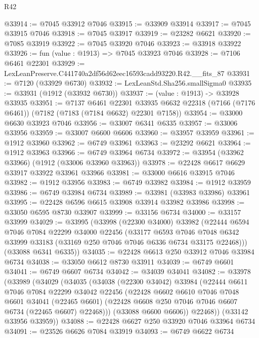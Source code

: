 \begin{lexlean}{R42}
\begin{coremodule}
{@33914 := @7045 @33912 @7046
@33915 := @33909 @33914
@33917 := @7045 @33915 @7046
@33918 := @7045 @33917
@33919 := @23282 @6621
@33920 := @7085 @33919
@33922 := @7045 @33920 @7046
@33923 := @33918 @33922
@33926 := fun (value : @1913) => @7045 @33923 @7046
@33928 := @7106 @6461 @22301
@33929 := LexLeanPreserve.C441740a2df56d62eec16593cadd93220.R42.__fits_87
@33931 := @7120 (@33929 @6730)
@33932 := LexLeanStd.Sha256.smallSigma0
@33935 := @33931 (@1912 (@33932 @6730))
@33937 := (value : @1913) -> @33928 @33935
@33951 := @7137
    @6461
    @22301
    @33935
    @6632
    @22318
    (@7166 (@7176 @6461))
    (@7182 (@7183 (@7184 @6632) @22301 @7158))
@33954 := @33000 @6630 @33923 @7046
@33956 := @33007 @6341 @6335
@33957 := @33006 @33956
@33959 := @33007 @6600 @6606
@33960 := @33957 @33959
@33961 := @1912 @33960
@33962 := @6749 @33961
@33963 := @23292 @6621
@33964 := @1912 @33963
@33966 := @6749 @33964 @6734
@33972 := @33954 (@33962 @33966) (@1912 (@33006 @33960 @33963))
@33978 := @22428 @6617 @6629 @33917 @33922 @33961 @33966
@33981 := @33000 @6616 @33915 @7046
@33982 := @1912 @33956
@33983 := @6749 @33982
@33984 := @1912 @33959
@33986 := @6749 @33984 @6734
@33989 := @33981 (@33983 @33986) @33961
@33995 := @22428 @6596 @6615 @33908 @33914 @33982 @33986
@33998 := @33050 @6595 @8730 @33907
@33999 := @33156 @6734
@34000 := @33157 @33999
@34029 := @33995
    (@33998
      (@22300 @34000)
      @33982
      (@22444
        @6594
        @7046
        @7084
        @22299
        @34000
        @22456
        (@33177
          @6593
          @7046
          @7048
          @6342
          @33999
          @33183
          (@33169 @250 @7046 @7046 @6336 @6734 @33175 @22468)))
      (@33088 @6341 @6335))
@34035 := @22428 @6613 @250 @33912 @7046 @33984 @6734
@34038 := @33050 @6612 @8730 @33911
@34039 := @6749 @6601
@34041 := @6749 @6607 @6734
@34042 := @34039 @34041
@34082 := @33978
    (@33989
      (@34029
        (@34035
          (@34038
            (@22300 @34042)
            @33984
            (@22444
              @6611
              @7046
              @7084
              @22299
              @34042
              @22456
              (@22428
                @6602
                @6610
                @7046
                @7048
                @6601
                @34041
                (@22465 @6601)
                (@22428 @6608 @250 @7046 @7046 @6607 @6734 (@22465 @6607) @22468)))
            (@33088 @6600 @6606))
          @22468))
      (@33142 @33956 @33959))
@34088 := @22428 @6627 @250 @33920 @7046 @33964 @6734
@34091 := @23526 @6626 @7084 @33919
@34093 := @6749 @6622 @6734
}
\end{coremodule}
\end{lexlean}

